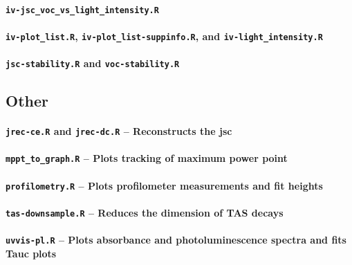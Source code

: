 		\paragraph{\texttt{iv-jsc\_voc\_vs\_light\_intensity.R}}
		\paragraph{\texttt{iv-plot\_list.R}, \texttt{iv-plot\_list-suppinfo.R}, and \texttt{iv-light\_intensity.R}}

		\paragraph{\texttt{jsc-stability.R} and \texttt{voc-stability.R}}

	\subsection{Other}
	
				\paragraph{\texttt{jrec-ce.R} and \texttt{jrec-dc.R} -- Reconstructs the \gls{jsc}}
					
		\paragraph{\texttt{mppt\_to\_graph.R} -- Plots tracking of maximum power point}
		\paragraph{\texttt{profilometry.R} -- Plots profilometer measurements and fit heights}
		\paragraph{\texttt{tas-downsample.R} -- Reduces the dimension of TAS decays}
		\paragraph{\texttt{uvvis-pl.R} -- Plots absorbance and photoluminescence spectra and fits Tauc plots}

